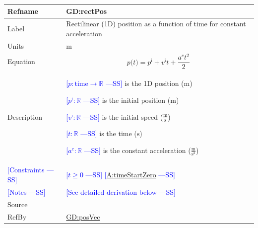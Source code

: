 \documentclass[12pt]{article}
\newcommand{\authornote}[3]{\textcolor{#1}{[#3 ---#2]}}
\newcommand{\authornote}[3]{}
\newcommand{\wss}[1]{\authornote{blue}{SS}{#1}}
\begin{document}
\medskip
\noindent
\begin{minipage}{\textwidth}
\begin{tabular}{>{\raggedright}p{}>{\raggedright\arraybackslash}p{}}
\toprule \textbf{Refname} & \textbf{GD:rectPos}
\label{GD:rectPos}
\\ \midrule
Label & Rectilinear (1D) position as a function of time for constant acceleration
        
\\ \midrule
Units & ${\text{m}}$
        
\\ \midrule
Equation & \begin{displaymath}
           p\text{(}t\text{)}={p^{\text{i}}}+{v^{\text{i}}} t+\frac{{a^{c}} t^{2}}{2}
           \end{displaymath}

\\ \midrule
Description & \begin{symbDescription}
              \item{\wss{$p: \text{time} \rightarrow \mathbb{R}$} is the 1D position (${\text{m}}$)}
              \item{\wss{${p^{\text{i}}}: \mathbb{R}$} is the initial position (${\text{m}}$)}
              \item{\wss{${v^{\text{i}}}: \mathbb{R}$} is the initial speed ($\frac{\text{m}}{\text{s}}$)}
              \item{\wss{$t: \mathbb{R}$} is the time (${\text{s}}$)}
              \item{\wss{${a^{c}}: \mathbb{R}$} is the constant acceleration ($\frac{\text{m}}{\text{s}^{2}}$)}
              \end{symbDescription}
\\ \midrule
\wss{Constraints} & \wss{$t \geq 0$} \wss{\hyperref[timeStartZero]{A:timeStartZero}}

\\ \midrule
\wss{Notes} & \wss{See detailed derivation below}

\\ \midrule
Source & \cite[(pg. 8)]{hibbeler2004}
         
\\ \midrule
RefBy & \hyperref[GD:posVec]{GD:posVec}
        
\\ \bottomrule
\end{tabular}
\end{minipage}
\end{document}
